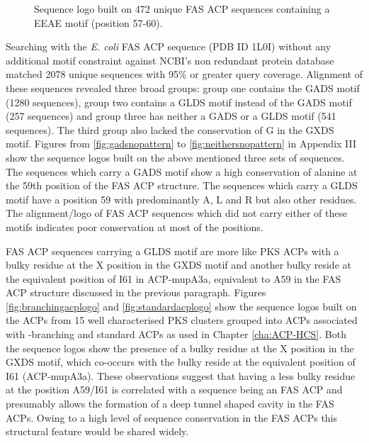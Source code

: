 		\setlength\fboxsep{5pt}
		\setlength\fboxrule{1.5pt}
		\begin{figure}[htbp]
		\centering
		\caption[Sequence logo built on 472 unique FAS ACP sequences containing a EEAE motif.]{Sequence logo built on 472 unique FAS ACP sequences containing a EEAE motif (position 57-60).}
		\label{fig:eeae_95}
		\end{figure}			
	
	Searching with the \textit{E. coli} FAS ACP sequence (PDB ID 1L0I) without any additional motif constraint against NCBI's non redundant protein database matched 2078 unique sequences with 95\% or greater query coverage. Alignment of these sequences revealed three broad groups: group one contains the GADS motif (1280 sequences), group two contains a GLDS motif instead of the GADS motif (257 sequences) and group three has neither a GADS or a GLDS motif (541 sequences). The third group also lacked the conservation of G in the GXDS motif. Figures from \ref{fig:gadsnopattern} to \ref{fig:neithersnopattern} in Appendix III show the sequence logos built on the above mentioned three sets of sequences. The sequences which carry a GADS motif show a high conservation of alanine at the 59th position of the FAS ACP structure. The sequences which carry a GLDS motif have a position 59 with predominantly A, L and R but also other residues. The alignment/logo of FAS ACP sequences which did  not carry either of these motifs indicates poor conservation at most of the positions. 
	
	FAS ACP sequences carrying a GLDS motif are more like PKS ACPs with a bulky residue	at the X position in the GXDS motif and another bulky reside at the equivalent position of I61 in ACP-mupA3a, equivalent to A59 in the FAS ACP structure discussed in the previous paragraph. Figures \ref{fig:branchingacplogo} and \ref{fig:standardacplogo} show the sequence logos built on the ACPs from 15 well characterised PKS clusters grouped into ACPs associated with \bet-branching and standard ACPs as used in Chapter \ref{cha:ACP-HCS}. Both the sequence logos show the presence of a bulky residue at the X position in the GXDS motif, which co-occurs with the bulky reside at the equivalent position of I61 (ACP-mupA3a). These observations suggest that having a less bulky residue at the position A59/I61 is correlated with a sequence being an FAS ACP and presumably allows the formation of a deep tunnel shaped cavity in the FAS ACPs. Owing to a high level of sequence conservation in the FAS ACPs this structural feature would be shared widely. 
	

